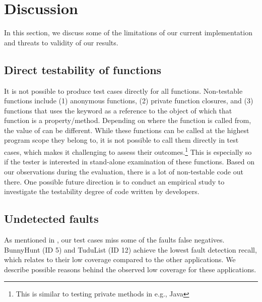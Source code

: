 \section{Discussion} \label{Sec:discussion}
In this section, we discuss some of the limitations of our current implementation and threats to validity of our results.

\subsection{Direct testability of functions} It is not possible to produce test cases directly for all \javascript functions.
Non-testable \javascript functions include (1) anonymous functions, (2) private function closures, and (3) functions that uses the  keyword as a reference to the object of which that function is a property/method. Depending on where the function is called from, the value of  can be different.
While these functions can be called at the highest program scope they belong to, it is not possible to call them directly in test cases, which makes it challenging to assess their outcomes.\footnote{This is similar to testing private methods in e.g., Java} This is especially so if the tester is interested in stand-alone examination of these functions.  Based on our observations during the evaluation, there is a lot of non-testable \javascript code out there. One possible future direction is to conduct an empirical study to investigate the testability degree of \javascript code written by developers.
 
\subsection{Undetected faults} As mentioned in , our test cases miss some of the faults \ie false negatives. 
BunnyHunt (ID 5) and TuduList (ID 12) achieve the lowest fault detection recall, which relates to their low coverage compared to the other applications. 
We describe possible reasons behind the observed low coverage for these applications.  

